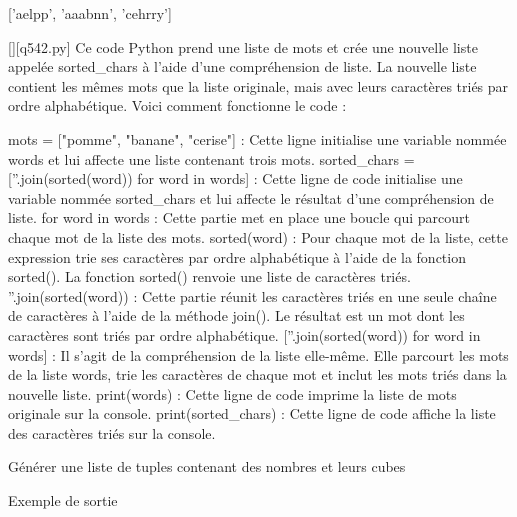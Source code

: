['aelpp', 'aaabnn', 'cehrry']
        \par
        \begin{solution}
            \renewcommand{\nomfichier}{q542.py}
            \pythonfile{\chemincode \nomfichier}[][\nomfichier]
            Ce code Python prend une liste de mots et crée une nouvelle liste appelée sorted_chars à l'aide d'une compréhension de liste. La nouvelle liste contient les mêmes mots que la liste originale, mais avec leurs caractères triés par ordre alphabétique. Voici comment fonctionne le code :

    mots = ["pomme", "banane", "cerise"] : Cette ligne initialise une variable nommée words et lui affecte une liste contenant trois mots.
    sorted_chars = [''.join(sorted(word)) for word in words] : Cette ligne de code initialise une variable nommée sorted_chars et lui affecte le résultat d'une compréhension de liste.
        for word in words : Cette partie met en place une boucle qui parcourt chaque mot de la liste des mots.
        sorted(word) : Pour chaque mot de la liste, cette expression trie ses caractères par ordre alphabétique à l'aide de la fonction sorted(). La fonction sorted() renvoie une liste de caractères triés.
        ''.join(sorted(word)) : Cette partie réunit les caractères triés en une seule chaîne de caractères à l'aide de la méthode join(). Le résultat est un mot dont les caractères sont triés par ordre alphabétique.
        [''.join(sorted(word)) for word in words] : Il s'agit de la compréhension de la liste elle-même. Elle parcourt les mots de la liste words, trie les caractères de chaque mot et inclut les mots triés dans la nouvelle liste.
    print(words) : Cette ligne de code imprime la liste de mots originale sur la console.
    print(sorted_chars) : Cette ligne de code affiche la liste des caractères triés sur la console.
        \end{solution}
        

        \question
        Générer une liste de tuples contenant des nombres et leurs cubes

Exemple de sortie

